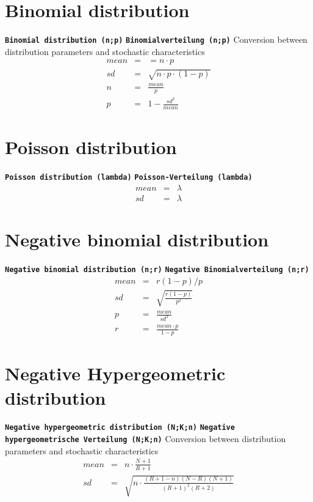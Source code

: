 \documentclass{svmono}
\def\cm#1{\textbf{\texttt{#1}}}
\begin{document}
\section*{Binomial distribution}
\cm{Binomial distribution (n;p)}
\cm{Binomialverteilung (n;p)}
Conversion between distribution parameters and stochastic characteristics
\begin{eqnarray*}
mean&=&=n\cdot p\\
sd&=&\sqrt{n\cdot p\cdot (1-p)}\\
n&=&\frac{mean}{p}\\
p&=&1-\frac{sd^2}{mean}
\end{eqnarray*}





\section*{Poisson distribution}
\cm{Poisson distribution (lambda)}
\cm{Poisson-Verteilung (lambda)}
\begin{eqnarray*}
mean&=&\lambda\\
sd&=&\lambda
\end{eqnarray*}





\section*{Negative binomial distribution}
\cm{Negative binomial distribution (n;r)}
\cm{Negative Binomialverteilung (n;r)}
\begin{eqnarray*}
mean&=&r(1-p)/p\\
sd&=&\sqrt{\frac{r(1-p)}{p^2}}\\
p&=&\frac{mean}{sd^2}\\
r&=&\frac{mean\cdot p}{1-p}
\end{eqnarray*}





\section*{Negative Hypergeometric distribution}
\cm{Negative hypergeometric distribution (N;K;n)}
\cm{Negative hypergeometrische Verteilung (N;K;n)}
Conversion between distribution parameters and stochastic characteristics
\begin{eqnarray*}
mean&=&n\cdot\frac{N+1}{R+1}\\
sd&=&\sqrt{n\cdot\frac{(R+1-n)(N-R)(N+1)}{(R+1)^2(R+2)}}
\end{eqnarray*}
\end{document}
